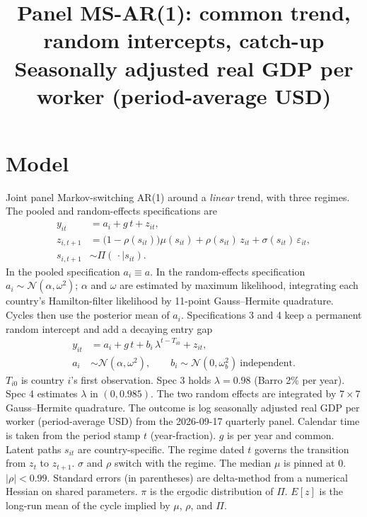 \documentclass[11pt]{article}
\title{Panel MS-AR(1): common trend, random intercepts, catch-up\\[0.4em]\large Seasonally adjusted real GDP per worker (period-average USD)}
\author{}
\date{}
\begin{document}
\maketitle
\section{Model}
Joint panel Markov-switching AR(1) around a \emph{linear} trend, with three regimes. The pooled and random-effects specifications are
\begin{align}
y_{it} &= a_i + g\, t + z_{it}, \\
z_{i,t+1} &= \bigl(1-\rho(s_{it})\bigr)\mu(s_{it}) + \rho(s_{it})\, z_{it} + \sigma(s_{it})\,\varepsilon_{it}, \\
s_{i,t+1} &\sim \Pi(\,\cdot\mid s_{it}).
\end{align}
In the pooled specification $a_i\equiv a$. In the random-effects specification $a_i\sim\mathcal{N}(\alpha,\omega^2)$; $\alpha$ and $\omega$ are estimated by maximum likelihood, integrating each country's Hamilton-filter likelihood by 11-point Gauss--Hermite quadrature. Cycles then use the posterior mean of $a_i$. Specifications 3 and 4 keep a permanent random intercept and add a decaying entry gap
\begin{align}
y_{it} &= a_i + g\, t + b_i\,\lambda^{t-T_{i0}} + z_{it}, \\
a_i &\sim \mathcal{N}(\alpha,\omega^2),\qquad b_i \sim \mathcal{N}(0,\omega_b^2) \ \text{independent}.
\end{align}
$T_{i0}$ is country $i$'s first observation. Spec 3 holds $\lambda=0.98$ (Barro 2\% per year). Spec 4 estimates $\lambda$ in $(0,0.985)$. The two random effects are integrated by $7\times 7$ Gauss--Hermite quadrature. The outcome is log seasonally adjusted real GDP per worker (period-average USD) from the 2026-09-17 quarterly panel. Calendar time is taken from the period stamp $t$ (year-fraction). $g$ is per year and common. Latent paths $s_{it}$ are country-specific. The regime dated $t$ governs the transition from $z_t$ to $z_{t+1}$. $\sigma$ and $\rho$ switch with the regime. The median $\mu$ is pinned at 0. $|\rho|<0.99$.
Standard errors (in parentheses) are delta-method from a numerical Hessian on shared parameters. $\pi$ is the ergodic distribution of $\Pi$. $E[z]$ is the long-run mean of the cycle implied by $\mu$, $\rho$, and $\Pi$.
\clearpage
\end{document}
